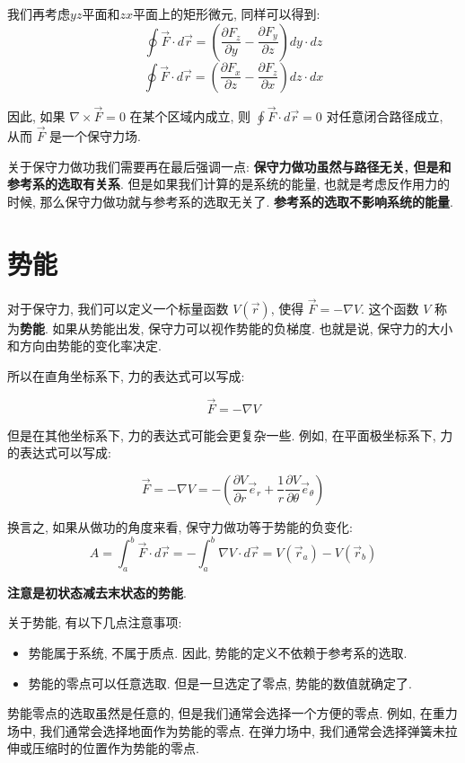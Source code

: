 \documentclass[
  a4paper,
]{ctexrep}
\providecommand{\tightlist}{%
  \setlength{\itemsep}{0pt}\setlength{\parskip}{0pt}}
\begin{document}
我们再考虑\(yz\)平面和\(zx\)平面上的矩形微元, 同样可以得到:
\[\oint \vec{F} \cdot d\vec{r} = \left(\frac{\partial F_z}{\partial y} - \frac{\partial F_y}{\partial z}\right) dy \cdot dz\]
\[\oint \vec{F} \cdot d\vec{r} = \left(\frac{\partial F_x}{\partial z} - \frac{\partial F_z}{\partial x}\right) dz \cdot dx\]

因此, 如果 \(\nabla \times \vec{F} = 0\) 在某个区域内成立, 则
\(\oint \vec{F} \cdot d\vec{r} = 0\) 对任意闭合路径成立, 从而
\(\vec{F}\) 是一个保守力场.

关于保守力做功我们需要再在最后强调一点:
\textbf{保守力做功虽然与路径无关, 但是和参考系的选取有关系}.
但是如果我们计算的是系统的能量, 也就是考虑反作用力的时候,
那么保守力做功就与参考系的选取无关了.
\textbf{参考系的选取不影响系统的能量}.

\section{势能}\label{ux52bfux80fd}

对于保守力, 我们可以定义一个标量函数 \(V(\vec{r})\), 使得
\(\vec{F} = -\nabla V\). 这个函数 \(V\) 称为\textbf{势能}.
如果从势能出发, 保守力可以视作势能的负梯度. 也就是说,
保守力的大小和方向由势能的变化率决定.

所以在直角坐标系下, 力的表达式可以写成:

\[
\vec{F} = -\nabla V
\]

但是在其他坐标系下, 力的表达式可能会更复杂一些. 例如, 在平面极坐标系下,
力的表达式可以写成:

\[
\vec{F} = -\nabla V = -\left( \frac{\partial V}{\partial r} \vec{e}_r + \frac{1}{r} \frac{\partial V}{\partial \theta} \vec{e}_\theta \right)
\]

换言之, 如果从做功的角度来看, 保守力做功等于势能的负变化: \[
A = \int_a^b \vec{F} \cdot d\vec{r} = -\int_a^b \nabla V \cdot d\vec{r} = V(\vec{r}_a) - V(\vec{r}_b)
\]

\textbf{注意是初状态减去末状态的势能}.

关于势能, 有以下几点注意事项:

\begin{itemize}
\tightlist
\item
  势能属于系统, 不属于质点. 因此, 势能的定义不依赖于参考系的选取.
\item
  势能的零点可以任意选取. 但是一旦选定了零点, 势能的数值就确定了.
\end{itemize}

势能零点的选取虽然是任意的, 但是我们通常会选择一个方便的零点. 例如,
在重力场中, 我们通常会选择地面作为势能的零点. 在弹力场中,
我们通常会选择弹簧未拉伸或压缩时的位置作为势能的零点.
\end{document}
